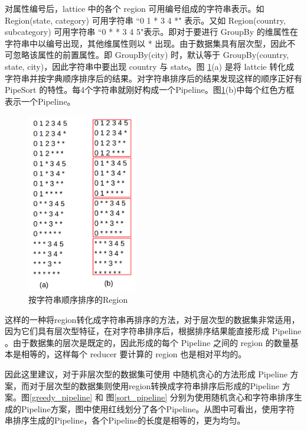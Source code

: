 对属性编号后，lattice 中的各个 region 可用编号组成的字符串表示。如 Region(state, category) 可用字符串 ``0 1 * 3 4 *" 表示。又如 Region(country, subcategory) 可用字符串 ``0 * * 3 4 5"表示。即对于要进行 GroupBy 的维属性在字符串中以编号出现，其他维属性则以 * 出现。由于数据集具有层次型，因此不可忽略该属性的前置属性。即 GroupBy(city) 时，默认等于 GroupBy(country, state, city)，因此字符串中要出现 country 与 state。图 \ref{sorted_region}(a) 是将 lattcie 转化成字符串并按字典顺序排序后的结果。对字符串排序后的结果发现这样的顺序正好有 PipeSort 的特性。每4个字符串就刚好构成一个Pipeline。图\ref{sorted_region}(b)中每个红色方框表示一个Pipeline。

\begin{figure}[!h] 
\centering\includegraphics[width=1.9in]{picture/ch_terasort_mr/sorted_region} 
\caption{按字符串顺序排序的Region}\label{sorted_region} 
\end{figure}

这样的一种将region转化成字符串再排序的方法，对于层次型的数据集非常适用，因为它们具有层次型特征，在对字符串排序后，根据排序结果能直接形成 Pipeline 。由于数据集的层次是既定的，因此形成的每个 Pipeline 之间的 region 的数量基本是相等的，这样每个 reducer 要计算的 region 也是相对平均的。

因此这里建议，对于非层次型的数据集可使用 \cite{wang2013scalable} 中随机贪心的方法形成 Pipeline 方案，而对于层次型的数据集则使用region转换成字符串排序后形成的Pipeline 方案。图\ref{greedy_pipeline} 和 图\ref{sort_pipeline} 分别为使用随机贪心和字符串排序生成的Pipeline方案，图中使用红线划分了各个Pipeline。从图中可看出，使用字符串排序生成的Pipeline，各个Pipeline的长度是相等的，更为均匀。


